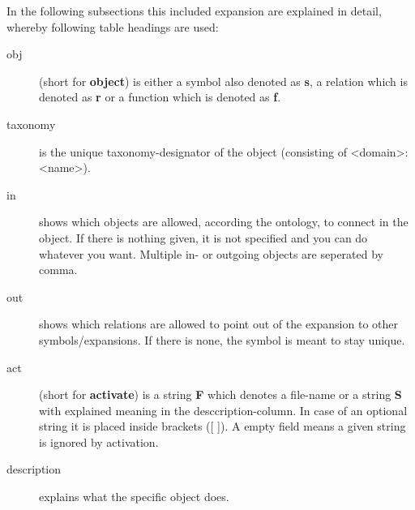 \documentclass[a4paper, 12pt, openany]{scrbook}
\begin{document}
In the following subsections this included expansion are explained in detail, whereby following table headings are used:
\begin{description}
\item[obj] (short for \textbf{object}) is either a symbol also denoted as \textbf{s}, a relation which is denoted as \textbf{r} or a function which is denoted as \textbf{f}.
\item[taxonomy] is the unique taxonomy-designator of the object (consisting of <domain>:<name>).
\item[in] shows which objects are allowed, according the ontology, to connect in the object. If there is nothing given, it is not specified and you can do whatever you want. Multiple in- or outgoing objects are seperated by comma.
\item[out] shows which relations are allowed to point out of the expansion to other symbols/expansions. If there is none, the symbol is meant to stay unique.
\item[act] (short for \textbf{activate}) is a string \textbf{F} which denotes a file-name or a string \textbf{S} with explained meaning in the desccription-column. In case of an optional string it is placed inside brackets ([ ]). A empty field means a given string is ignored by activation.
\item[description] explains what the specific object does.
\end{description}
\end{document}
